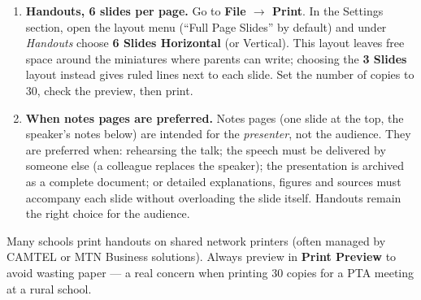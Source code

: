 \documentclass[11pt]{article}
\begin{document}
\begin{corrige}
\begin{enumerate}
\item \textbf{Handouts, 6 slides per page.} Go to \textbf{File $\rightarrow$ Print}. In the Settings section, open the layout menu (``Full Page Slides'' by default) and under \emph{Handouts} choose \textbf{6 Slides Horizontal} (or Vertical). This layout leaves free space around the miniatures where parents can write; choosing the \textbf{3 Slides} layout instead gives ruled lines next to each slide. Set the number of copies to 30, check the preview, then print.
\item \textbf{When notes pages are preferred.} Notes pages (one slide at the top, the speaker's notes below) are intended for the \emph{presenter}, not the audience. They are preferred when: rehearsing the talk; the speech must be delivered by someone else (a colleague replaces the speaker); the presentation is archived as a complete document; or detailed explanations, figures and sources must accompany each slide without overloading the slide itself. Handouts remain the right choice for the audience.
\end{enumerate}
\begin{savaistu}
Many schools print handouts on shared network printers (often managed by CAMTEL or MTN Business solutions). Always preview in \textbf{Print Preview} to avoid wasting paper — a real concern when printing 30 copies for a PTA meeting at a rural school.
\end{savaistu}
\end{corrige}
\end{document}

